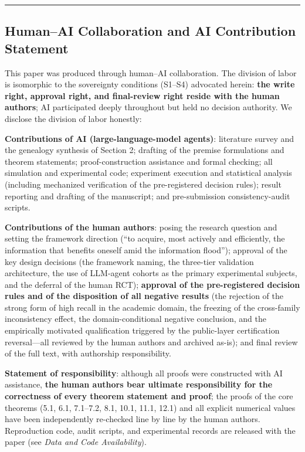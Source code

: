 \documentclass[
  11pt]{article}
\begin{document}
\begin{center}\rule{0.5\linewidth}{0.5pt}\end{center}

\subsection{Human--AI Collaboration and AI Contribution
Statement}\label{humanai-collaboration-and-ai-contribution-statement}

This paper was produced through human--AI collaboration. The division of
labor is isomorphic to the sovereignty conditions (S1--S4) advocated
herein: \textbf{the write right, approval right, and final-review right
reside with the human authors}; AI participated deeply throughout but
held no decision authority. We disclose the division of labor honestly:

\textbf{Contributions of AI (large-language-model agents)}: literature
survey and the genealogy synthesis of Section 2; drafting of the premise
formulations and theorem statements; proof-construction assistance and
formal checking; all simulation and experimental code; experiment
execution and statistical analysis (including mechanized verification of
the pre-registered decision rules); result reporting and drafting of the
manuscript; and pre-submission consistency-audit scripts.

\textbf{Contributions of the human authors}: posing the research
question and setting the framework direction (``to acquire, most
actively and efficiently, the information that benefits oneself amid the
information flood''); approval of the key design decisions (the
framework naming, the three-tier validation architecture, the use of
LLM-agent cohorts as the primary experimental subjects, and the deferral
of the human RCT); \textbf{approval of the pre-registered decision rules
and of the disposition of all negative results} (the rejection of the
strong form of high recall in the academic domain, the freezing of the
cross-family inconsistency effect, the domain-conditional negative
conclusion, and the empirically motivated qualification triggered by the
public-layer certification reversal---all reviewed by the human authors
and archived as-is); and final review of the full text, with authorship
responsibility.

\textbf{Statement of responsibility}: although all proofs were
constructed with AI assistance, \textbf{the human authors bear ultimate
responsibility for the correctness of every theorem statement and
proof}; the proofs of the core theorems (5.1, 6.1, 7.1--7.2, 8.1, 10.1,
11.1, 12.1) and all explicit numerical values have been independently
re-checked line by line by the human authors. Reproduction code, audit
scripts, and experimental records are released with the paper (see
\emph{Data and Code Availability}).
\end{document}
